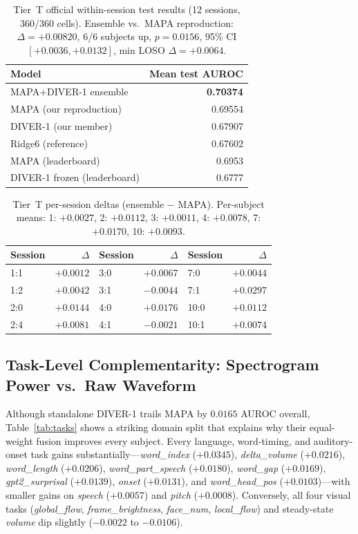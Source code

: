 \documentclass[11pt]{article}
\begin{document}
\begin{table}[htbp]\centering\small
\begin{tabular}{lr}\toprule
Model & Mean test AUROC\\\midrule
MAPA+DIVER-1 ensemble & \textbf{0.70374}\\
MAPA (our reproduction) & 0.69554\\
DIVER-1 (our member) & 0.67907\\
Ridge6 (reference) & 0.67602\\\midrule
MAPA (leaderboard) & 0.6953\phantom{0}\\
DIVER-1 frozen (leaderboard) & 0.6777\phantom{0}\\\bottomrule
\end{tabular}
\caption{Tier~T official within-session test results (12 sessions, 360/360 cells). Ensemble vs.\ MAPA reproduction: $\Delta=+0.00820$, 6/6 subjects up, $p=0.0156$, 95\% CI $[+0.0036,+0.0132]$, min LOSO $\Delta=+0.0064$.}
\label{tab:tiert}
\end{table}

\begin{table}[htbp]\centering\small
\begin{tabular}{lr@{\qquad}lr@{\qquad}lr}\toprule
Session & $\Delta$ & Session & $\Delta$ & Session & $\Delta$\\\midrule
1:1 & $+0.0012$ & 3:0 & $+0.0067$ & 7:0 & $+0.0044$\\
1:2 & $+0.0042$ & 3:1 & $-0.0044$ & 7:1 & $+0.0297$\\
2:0 & $+0.0144$ & 4:0 & $+0.0176$ & 10:0 & $+0.0112$\\
2:4 & $+0.0081$ & 4:1 & $-0.0021$ & 10:1 & $+0.0074$\\\bottomrule
\end{tabular}
\caption{Tier~T per-session deltas (ensemble $-$ MAPA). Per-subject means: 1: $+0.0027$, 2: $+0.0112$, 3: $+0.0011$, 4: $+0.0078$, 7: $+0.0170$, 10: $+0.0093$.}
\label{tab:sessions}
\end{table}

\subsection{Task-Level Complementarity: Spectrogram Power vs.\ Raw Waveform}
Although standalone DIVER-1 trails MAPA by $0.0165$ AUROC overall, Table~\ref{tab:tasks} shows a striking domain split that explains why their equal-weight fusion improves every subject. Every language, word-timing, and auditory-onset task gains substantially---\emph{word\_index} ($+0.0345$), \emph{delta\_volume} ($+0.0216$), \emph{word\_length} ($+0.0206$), \emph{word\_part\_speech} ($+0.0180$), \emph{word\_gap} ($+0.0169$), \emph{gpt2\_surprisal} ($+0.0139$), \emph{onset} ($+0.0131$), and \emph{word\_head\_pos} ($+0.0103$)---with smaller gains on \emph{speech} ($+0.0057$) and \emph{pitch} ($+0.0008$). Conversely, all four visual tasks (\emph{global\_flow}, \emph{frame\_brightness}, \emph{face\_num}, \emph{local\_flow}) and steady-state \emph{volume} dip slightly ($-0.0022$ to $-0.0106$).
\end{document}
